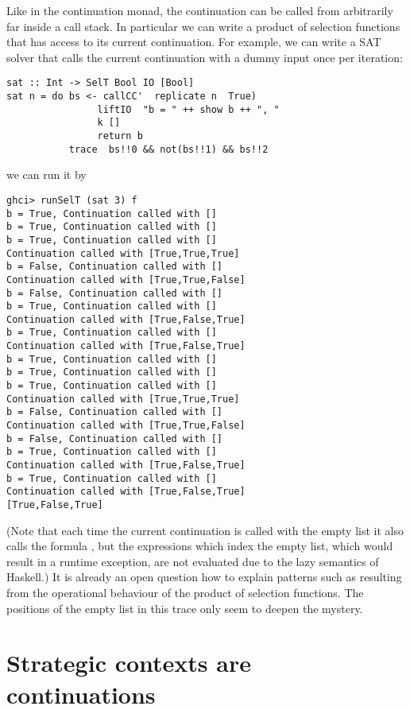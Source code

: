 \documentclass{article}
\begin{document}
Like in the continuation monad, the continuation can be called from arbitrarily far inside a call stack. In particular we can write a product of selection functions that has access to its current continuation. For example, we can write a SAT solver that calls the current continuation with a dummy input once per iteration:
\begin{verbatim}
sat :: Int -> SelT Bool IO [Bool]
sat n = do bs <- callCC'  replicate n  True)
                liftIO  "b = " ++ show b ++ ", "
                k []
                return b
           trace  bs!!0 && not(bs!!1) && bs!!2
\end{verbatim}
we can run it by
\begin{verbatim}
ghci> runSelT (sat 3) f
b = True, Continuation called with []
b = True, Continuation called with []
b = True, Continuation called with []
Continuation called with [True,True,True]
b = False, Continuation called with []
Continuation called with [True,True,False]
b = False, Continuation called with []
b = True, Continuation called with []
Continuation called with [True,False,True]
b = True, Continuation called with []
Continuation called with [True,False,True]
b = True, Continuation called with []
b = True, Continuation called with []
b = True, Continuation called with []
Continuation called with [True,True,True]
b = False, Continuation called with []
Continuation called with [True,True,False]
b = False, Continuation called with []
b = True, Continuation called with []
Continuation called with [True,False,True]
b = True, Continuation called with []
Continuation called with [True,False,True]
[True,False,True]
\end{verbatim}
(Note that each time the current continuation is called with the empty list it also calls the formula , but the expressions which index the empty list, which would result in a runtime exception, are not evaluated due to the lazy semantics of Haskell.) It is already an open question how to explain patterns such as  resulting from the operational behaviour of the product of selection functions. The positions of the empty list in this trace only seem to deepen the mystery.

\section{Strategic contexts are continuations}\label{games1}
\end{document}

